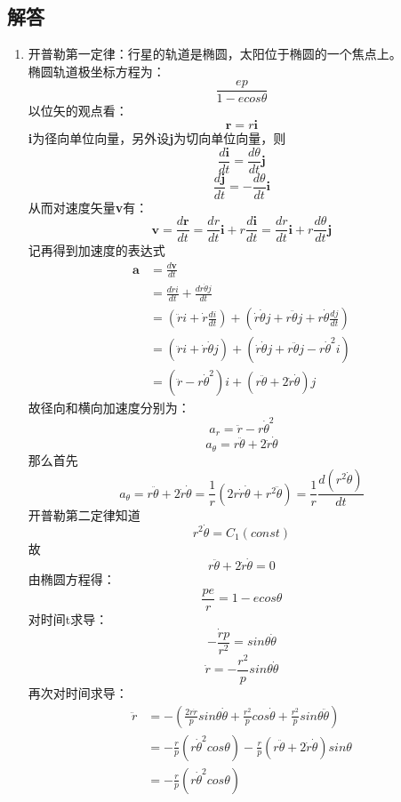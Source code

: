 \documentclass[12pt]{article}
\begin{document}
\begin{CJK*}{UTF8}{gbsn}
\subsection*{解答}
\begin{enumerate}
\item
开普勒第一定律：行星的轨道是椭圆，太阳位于椭圆的一个焦点上。\\
椭圆轨道极坐标方程为：
$$\frac{ep}{1-ecos\theta}$$
以位矢的观点看：
$$\textbf{r} = r \textbf{i}$$
\textbf{i}为径向单位向量，另外设\textbf{j}为切向单位向量，则
$$\frac{d\textbf{i}}{dt} = \frac{d\theta}{dt}\textbf{j}$$
$$\frac{d\textbf{j}}{dt} = -\frac{d\theta}{dt}\textbf{i}$$
从而对速度矢量\textbf{v}有：
$$\textbf{v} = \frac{d\textbf{r}}{dt} = \frac{dr}{dt}\textbf{i} + r \frac{d\textbf{i}}{dt} = \frac{dr}{dt}\textbf{i} + r\frac{d\theta}{dt}\textbf{j}$$
记再得到加速度的表达式
\begin{align*}
\textbf{a} &= \frac{d\textbf{v}}{dt}\\
           &= \frac{d\dot{r}i}{dt} + \frac{dr\dot{\theta}j}{dt}\\
           &= (\ddot{r}i + \dot{r}\frac{di}{dt}) + (\dot{r}\dot{\theta}j + r\ddot{\theta}j + r\dot{\theta}\frac{dj}{dt})\\
           &= (\ddot{r}i + \dot{r}\dot{\theta}j) + (\dot{r}\dot{\theta}j + r\ddot{\theta}j - r\dot{\theta}^{2}i)\\
           &= (\ddot{r} - r\dot{\theta}^{2})i + (r\ddot{\theta} + 2\dot{r}\dot{\theta})j
\end{align*}
故径向和横向加速度分别为：
$$a_{r} = \ddot{r} - r\dot{\theta}^{2}$$
$$a_{\theta} = r\ddot{\theta} + 2\dot{r}\dot{\theta}$$
那么首先
$$a_{\theta} = r\ddot{\theta} + 2\dot{r}\dot{\theta} = \frac{1}{r}(2r\dot{r}\dot{\theta} + r^{2}\ddot{\theta}) = \frac{1}{r} \frac{d(r^{2}\dot{\theta})}{dt}$$
开普勒第二定律知道
$$r^{2}\dot{\theta} = C_{1}(const)$$
故
$$r\ddot{\theta} + 2\dot{r}\dot{\theta} = 0$$
由椭圆方程得：
$$\frac{pe}{r} = 1 - ecos\theta$$
对时间t求导：
$$-\frac{\dot{r}p}{r^{2}} = sin\theta\dot{\theta}$$
$$\dot{r} = -\frac{r^{2}}{p}sin\theta\dot{\theta}$$
再次对时间求导：
\begin{align*}
\ddot{r} &= -(\frac{2r\dot{r}}{p}sin\theta\dot{\theta} + \frac{r^{2}}{p}cos\dot{\theta} + \frac{r^{2}}{p}sin\theta\ddot{\theta})\\
         &= -\frac{r}{p}(r\dot{\theta}^{2}cos\theta) - \frac{r}{p}(r\ddot{\theta} + 2\dot{r}\dot{\theta})sin\theta\\
         &= -\frac{r}{p}(r\dot{\theta}^{2}cos\theta)\\

\end{align*}
\end{enumerate}
\end{CJK*}
\end{document}
